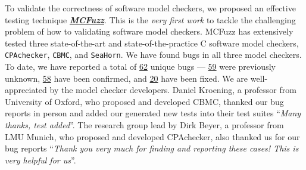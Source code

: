 \documentclass[a4paper]{article}
\begin{document}
To validate the correctness of software model checkers, we proposed an effective testing technique \textbf{\emph{\href{https://github.com/MCFuzzer/MCFuzz}{MCFuzz}}}. 
This is the \emph{very first work} to tackle the challenging problem of how to validating software model checkers.
MCFuzz has extensively tested three state-of-the-art and state-of-the-practice C software model checkers, \texttt{CPAchecker}, \texttt{CBMC}, and \texttt{SeaHorn}. We have found bugs in all
three model checkers. To date, we have reported a total of \underline{62} unique bugs --- \underline{59} were previously unknown, \underline{58} have been confirmed, and \underline{20} have been fixed. We are well-appreciated by the model checker developers.
Daniel Kroening, a professor from University of Oxford, who proposed and developed CBMC, thanked our bug reports in person and added our generated new tests into their test suites ``\emph{Many thanks, test added}''.
The research group lead by Dirk Beyer, a professor from LMU Munich, who proposed and developed CPAchecker, also thanked us for our bug reports ``\emph{Thank you very much for finding and reporting these cases! This is very helpful for us}''.
\end{document}
